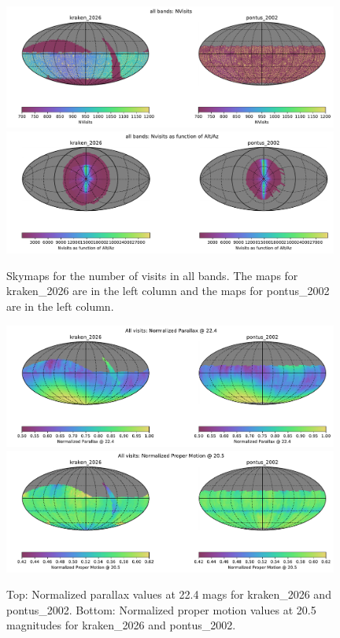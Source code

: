 \documentclass[DM,lsstdraft,authoryear,toc]{lsstdoc}
\begin{document}
\begin{figure}[ht]
\centering
\includegraphics[width=0.98\textwidth]{figures/pontus_2002_kraken_2026_NVisits_all_bands_HEAL_ComboSkyMap.pdf}\\
\includegraphics[width=0.98\textwidth]{figures/pontus_2002_kraken_2026_Nvisits_as_function_of_Alt_Az_all_bands_HEAL_ComboSkyMap.pdf}
\caption{Skymaps for the number of visits in all bands. The maps for kraken\_2026 are in the left column and the maps for pontus\_2002 are
in the left column.}
\label{fig:nvisits-2002}
\end{figure}

\begin{figure}[ht]
\centering
\includegraphics[width=0.98\textwidth]{figures/pontus_2002_kraken_2026_Normalized_Parallax_22_4_All_visits_HEAL_ComboSkyMap.pdf}\\
\includegraphics[width=0.98\textwidth]{figures/pontus_2002_kraken_2026_Normalized_Proper_Motion_20_5_All_visits_HEAL_ComboSkyMap.pdf}
\caption{Top: Normalized parallax values at 22.4 mags for kraken\_2026 and pontus\_2002. Bottom: Normalized proper motion values
at 20.5 magnitudes for kraken\_2026 and pontus\_2002.}
\label{fig:parallax-pm-2002}
\end{figure}
\end{document}
